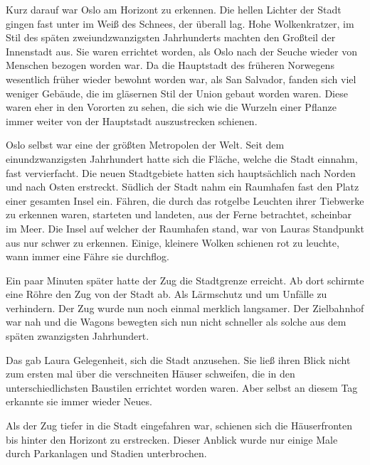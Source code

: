 \par

Kurz darauf war Oslo am Horizont zu erkennen. Die hellen Lichter der Stadt gingen fast unter im Weiß des Schnees, der überall lag. Hohe Wolkenkratzer, im Stil des späten zweiundzwanzigsten Jahrhunderts machten den Großteil der Innenstadt aus. Sie waren errichtet worden, als Oslo nach der Seuche wieder von Menschen bezogen worden war. Da die Hauptstadt des früheren Norwegens wesentlich früher wieder bewohnt worden war, als San Salvador, fanden sich viel weniger Gebäude, die im gläsernen Stil der Union gebaut worden waren. Diese waren eher in den Vororten zu sehen, die sich wie die Wurzeln einer Pflanze immer weiter von der Hauptstadt auszustrecken schienen.

\par

Oslo selbst war eine der größten Metropolen der Welt. Seit dem einundzwanzigsten Jahrhundert hatte sich die Fläche, welche die Stadt einnahm, fast vervierfacht. Die neuen Stadtgebiete hatten sich hauptsächlich nach Norden und nach Osten erstreckt. Südlich der Stadt nahm ein Raumhafen fast den Platz einer gesamten Insel ein. Fähren, die durch das rotgelbe Leuchten ihrer Tiebwerke zu erkennen waren, starteten und landeten, aus der Ferne betrachtet, scheinbar im Meer. Die Insel auf welcher der Raumhafen stand, war von Lauras Standpunkt aus nur schwer zu erkennen. Einige, kleinere Wolken schienen rot zu leuchte, wann immer eine Fähre sie durchflog.

\par

Ein paar Minuten später hatte der Zug die Stadtgrenze erreicht. Ab dort schirmte eine Röhre den Zug von der Stadt ab. Als Lärmschutz und um Unfälle zu verhindern. Der Zug wurde nun noch einmal merklich langsamer. Der Zielbahnhof war nah und die Wagons bewegten sich nun nicht schneller als solche aus dem späten zwanzigsten Jahrhundert.

\par

Das gab Laura Gelegenheit, sich die Stadt anzusehen. Sie ließ ihren Blick nicht zum ersten mal über die verschneiten Häuser schweifen, die in den unterschiedlichsten Baustilen errichtet worden waren. Aber selbst an diesem Tag erkannte sie immer wieder Neues.

\par

Als der Zug tiefer in die Stadt eingefahren war, schienen sich die Häuserfronten bis hinter den Horizont zu erstrecken. Dieser Anblick wurde nur einige Male durch Parkanlagen und Stadien unterbrochen.

